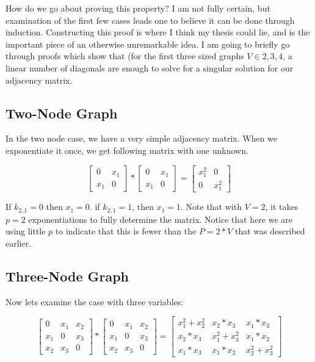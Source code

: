 \documentclass[a4paper,12pt]{article}
\begin{document}
How do we go about proving this property?  I am not fully certain, but examination of the first few cases
leads one to believe it can be done through induction. Constructing this proof is where I think my thesis
could lie, and is the important piece of an otherwise unremarkable idea. I am going to briefly go through
proofs which show that (for the first three sized graphs \(V \in {2, 3, 4}\), a linear number of diagonals are
enough to solve for a singular solution for our adjacency matrix.

\subsection*{Two-Node Graph}

In the two node case, we have a very simple adjacency matrix.  When we exponentiate it once, we get
following matrix with one unknown.

\[ \left[\begin{array}{cc}
0 & x_1 \\
x_1 & 0 \end{array} \right]
*
\left[\begin{array}{cc}
0 & x_1 \\
x_1 & 0 \end{array} \right]
=
\left[\begin{array}{cc}
x_1^2 & 0\\
0 & x_1^2 \end{array} \right]
\]

If \(k_{2,1} = 0\) then \(x_1 = 0\). if \(k_{2,1} = 1\), then \(x_1 = 1\).
Note that with \(V=2\), it takes \(p=2\) exponentiations to fully determine the matrix.  Notice that
here we are using little \(p\) to indicate that this is fewer than the \(P = 2 * V\) that was described
earlier.

\subsection*{Three-Node Graph}

Now lets examine the case with three variables:

\[ \left[\begin{array}{ccc}
0 & x_1 & x_2\\
x_1 & 0 & x_3\\
x_2 & x_3 & 0\end{array} \right]
*
\left[\begin{array}{ccc}
0 & x_1 & x_2\\
x_1 & 0 & x_3\\
x_2 & x_3 & 0\end{array} \right]
=
\left[\begin{array}{ccc}
x_1^2 + x_2^2 & x_2 * x_3 & x_1 * x_3\\
x_2 * x_3 & x_1^2 + x_3^2 & x_1 * x_2\\
x_1 * x_3 & x_1 * x_2 & x_2^2 + x_3^2
\end{array} \right]
\]
\end{document}
